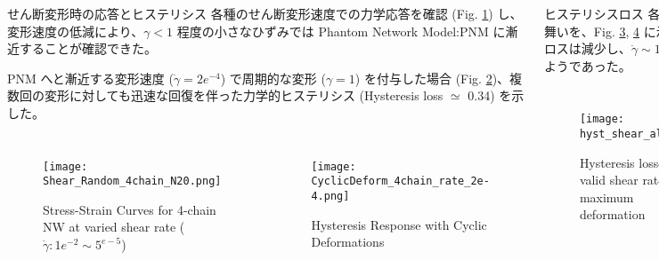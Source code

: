 \begin{columns}[totalwidth=.85\linewidth]
	\column{\textwidth}
	\vspace{-10mm}
		\begin{itembox}[l]{せん断変形時の応答とヒステリシス}
			各種のせん断変形速度での力学応答を確認 (Fig. \ref{deform}) し、変形速度の低減により、$\gamma<1$ 程度の小さなひずみでは Phantom Network Model:PNM に漸近することが確認できた。

			PNM へと漸近する変形速度 ($\dot{\gamma} = 2e^{-4}$) で周期的な変形 ($\gamma = 1$) を付与した場合 (Fig. \ref{cyclic})、複数回の変形に対しても迅速な回復を伴った力学的ヒステリシス (Hysteresis loss $\simeq$ 0.34) を示した。
			\begin{columns}[totalwidth=\linewidth]
				\begin{figure}[htb]
					\centering
						\texttt{[image: Shear\_Random\_4chain\_N20.png]}
						\caption{Stress-Strain Curves for 4-chain NW at varied shear rate ($\dot{\gamma}: 1e^{-2} \sim 5^{e-5}$)}
						\label{deform}
				\end{figure}
				\begin{figure}[htb]
					\centering
						\texttt{[image: CyclicDeform\_4chain\_rate\_2e-4.png]}
						\caption{Hysteresis Response with Cyclic Deformations}
						\label{cyclic}
				\end{figure}
				\end{columns}
		\end{itembox}

		\begin{itembox}[l]{ヒステリシスロス}
			各種の変形条件での力学的ヒステリシスの振る舞いを、Fig. \ref{hystall}, \ref{hystallcomp} に示した。
			変形速度の低下に伴いヒステリシスロスは減少し、$\dot{\gamma} \sim 1e^{-5}$ 程度のオーダーの時間スケールで消失するようであった。
			\begin{columns}[totalwidth=\linewidth]
					\begin{figure}[htb]
						\centering
							\texttt{[image: hyst\_shear\_all.png]}
							\caption{Hysteresis losses for valid shear rate and maximum deformation}
							\label{hystall}
					\end{figure}
				\begin{figure}[htb]
					\centering
						\texttt{[image: hyst\_shear.png]}
						\caption{Comparison of Hysteresis losses}
						\label{hystallcomp}
				\end{figure}
				\end{columns}
		\end{itembox}


\end{columns}
